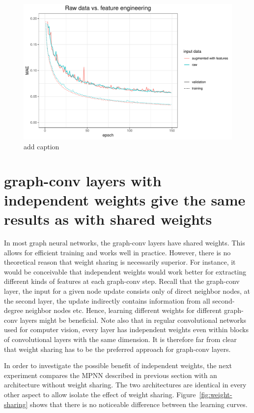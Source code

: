 \begin{figure}[H]
	\includegraphics[width=\linewidth]{figures/raw-data}
	\caption{add caption}
	\label{fig:raw-data}
\end{figure}



\section{graph-conv layers with independent weights give the same results as with shared weights}


In most graph neural networks, the graph-conv layers have shared weights. This allows for efficient training and works well in practice. However, there is no theoretical reason that weight sharing is necessarily superior. For instance, it would be conceivable that independent weights would work better for extracting different kinds of features at each graph-conv step. Recall that the graph-conv layer, the input for a given node update consists only of direct neighbor nodes, at the second layer, the update indirectly contains information from all second-degree neighbor nodes etc. Hence, learning different weights for different graph-conv layers might be beneficial. Note also that in regular convolutional networks used for computer vision, every layer has independent weights even within blocks of convolutional layers with the same dimension. It is therefore far from clear that weight sharing has to be the preferred approach for graph-conv layers.

In order to investigate the possible benefit of independent weights, the next experiment compares the MPNN described in previous section with an architecture without weight sharing. The two architectures are identical in every other aspect to allow isolate the effect of weight sharing. Figure~\ref{fig:weight-sharing} shows that there is no noticeable difference between the learning curves.

